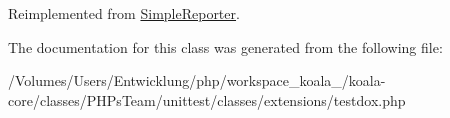 Reimplemented from \hyperlink{class_simple_reporter_a54672d58e0fad0e0e672159dd4f61124}{SimpleReporter}.



The documentation for this class was generated from the following file:\begin{DoxyCompactItemize}
\item 
/Volumes/Users/Entwicklung/php/workspace\_\-koala\_/koala-\/core/classes/PHPsTeam/unittest/classes/extensions/testdox.php\end{DoxyCompactItemize}
